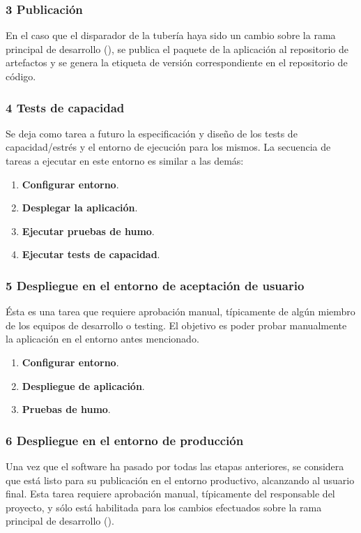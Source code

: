 \subsubsection{3 Publicación}

En el caso que el disparador de la tubería haya sido un cambio sobre
la rama principal de desarrollo (), se publica el
paquete de la aplicación al repositorio de artefactos y se genera la
etiqueta de versión correspondiente en el repositorio de código.

\subsubsection{4 Tests de capacidad}

Se deja como tarea a futuro la especificación y diseño de los tests de
capacidad/estrés y el entorno de ejecución para los mismos. La
secuencia de tareas a ejecutar en este entorno es similar a las demás:

\begin{enumerate}
\item \textbf{Configurar entorno}.
\item \textbf{Desplegar la aplicación}.
\item \textbf{Ejecutar pruebas de humo}.
\item \textbf{Ejecutar tests de capacidad}.
\end{enumerate}
\subsubsection{5 Despliegue en el entorno de aceptación de usuario}

Ésta es una tarea que requiere aprobación manual, típicamente de algún
miembro de los equipos de desarrollo o testing. El objetivo es poder
probar manualmente la aplicación en el entorno antes mencionado.

\begin{enumerate}
\item \textbf{Configurar entorno}.
\item \textbf{Despliegue de aplicación}.
\item \textbf{Pruebas de humo}.
\end{enumerate}
\subsubsection{6 Despliegue en el entorno de producción}

Una vez que el software ha pasado por todas las etapas anteriores, se
considera que está listo para su publicación en el entorno productivo,
alcanzando al usuario final. Esta tarea requiere aprobación manual,
típicamente del responsable del proyecto, y sólo está habilitada para
los cambios efectuados sobre la rama principal de desarrollo
().


